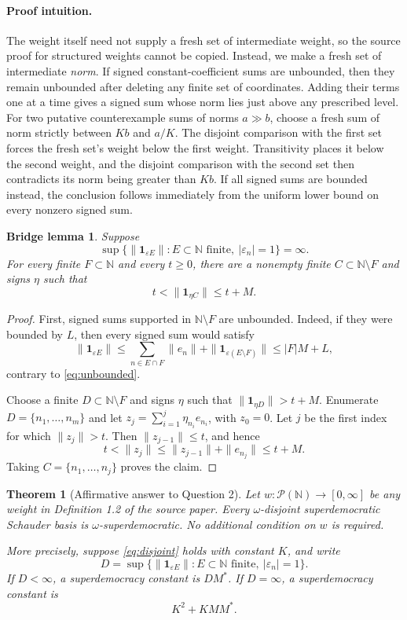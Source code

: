 \documentclass[11pt]{article}
\newtheorem*{theorem}{Theorem}
\newtheorem*{lemma}{Bridge lemma}
\newcommand{\N}{\mathbb N}
\newcommand{\one}{\mathbf 1}
\begin{document}
\paragraph{Proof intuition.}
The weight itself need not supply a fresh set of intermediate weight, so the
source proof for structured weights cannot be copied. Instead, we make a
fresh set of intermediate \emph{norm}. If signed constant-coefficient sums
are unbounded, then they remain unbounded after deleting any finite set of
coordinates. Adding their terms one at a time gives a signed sum whose norm
lies just above any prescribed level. For two putative counterexample sums
of norms \(a\gg b\), choose a fresh sum of norm strictly between \(Kb\) and
\(a/K\). The disjoint comparison with the first set forces the fresh set's
weight below the first weight. Transitivity places it below the second
weight, and the disjoint comparison with the second set then contradicts
its norm being greater than \(Kb\). If all signed sums are bounded instead,
the conclusion follows immediately from the uniform lower bound on every
nonzero signed sum.

\begin{lemma}
Suppose
\[
 \sup\{\|\one_{\varepsilon E}\|:
 E\subset\N\text{ finite},\ |\varepsilon_n|=1\}=\infty.
 \tag{2}\label{eq:unbounded}
\]
For every finite \(F\subset\N\) and every \(t\ge0\), there are a nonempty
finite \(C\subset\N\setminus F\) and signs \(\eta\) such that
\[
 t<\|\one_{\eta C}\|\le t+M.
 \tag{3}\label{eq:bridge}
\]
\end{lemma}

\begin{proof}
First, signed sums supported in \(\N\setminus F\) are unbounded. Indeed, if
they were bounded by \(L\), then every signed sum would satisfy
\[
 \|\one_{\varepsilon E}\|
 \le \sum_{n\in E\cap F}\|e_n\|
      +\|\one_{\varepsilon(E\setminus F)}\|
 \le |F|M+L,
\]
contrary to \eqref{eq:unbounded}.

Choose a finite \(D\subset\N\setminus F\) and signs \(\eta\) such that
\(\|\one_{\eta D}\|>t+M\). Enumerate
\(D=\{n_1,\ldots,n_m\}\) and let
\(z_j=\sum_{i=1}^j\eta_{n_i}e_{n_i}\), with \(z_0=0\). Let \(j\) be the
first index for which \(\|z_j\|>t\). Then \(\|z_{j-1}\|\le t\), and hence
\[
 t<\|z_j\|
 \le \|z_{j-1}\|+\|e_{n_j}\|
 \le t+M.
\]
Taking \(C=\{n_1,\ldots,n_j\}\) proves the claim.
\end{proof}

\begin{theorem}[Affirmative answer to Question 2]
Let \(w:\mathcal P(\N)\to[0,\infty]\) be any weight in Definition 1.2 of
the source paper. Every \(\omega\)-disjoint superdemocratic Schauder basis is
\(\omega\)-superdemocratic. No additional condition on \(w\) is required.

More precisely, suppose \eqref{eq:disjoint} holds with constant \(K\), and
write
\[
 D=\sup\{\|\one_{\varepsilon E}\|:
 E\subset\N\text{ finite},\ |\varepsilon_n|=1\}.
\]
If \(D<\infty\), a superdemocracy constant is \(DM^*\). If \(D=\infty\),
a superdemocracy constant is
\[
 K^2+KMM^*.
 \tag{4}\label{eq:constant}
\]
\end{theorem}
\end{document}
